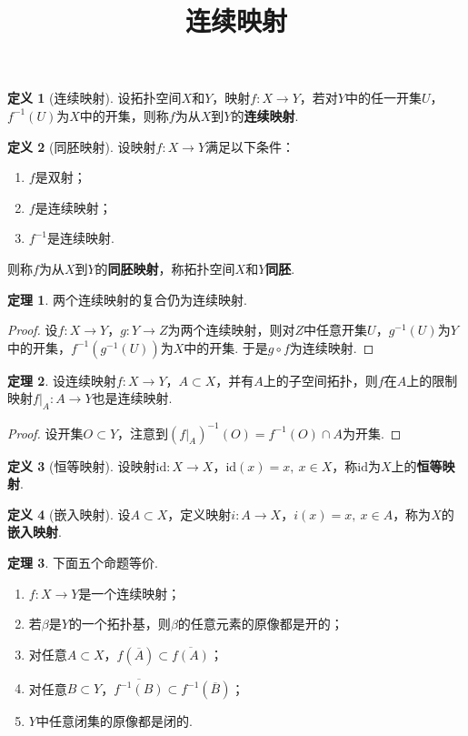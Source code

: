 \documentclass[12pt]{ctexart}
\title{\vspace{-2em}\textbf{连续映射}\vspace{-2em}}
\date{ }
\theoremstyle{definition}
\newtheorem{definition}{定义}
\newtheorem{theorem}{定理}
\theoremstyle{plain}
\begin{document}
	\maketitle
	\begin{definition}[连续映射]
		设拓扑空间$X$和$Y$，映射$f:X\to Y$，若对$Y$中的任一开集$U$，$f^{-1}(U)$为$X$中的开集，则称$f$为从$X$到$Y$的\textbf{连续映射}.
	\end{definition}
	\begin{definition}[同胚映射]
		设映射$f:X\to Y$满足以下条件：
		\begin{enumerate}
			\item $f$是双射；
			\item $f$是连续映射；
			\item $f^{-1}$是连续映射.
		\end{enumerate}
		则称$f$为从$X$到$Y$的\textbf{同胚映射}，称拓扑空间$X$和$Y$\textbf{同胚}.
	\end{definition}
	\begin{theorem}
		两个连续映射的复合仍为连续映射.
	\end{theorem}
	\begin{proof}
		设$f:X\to Y$，$g:Y\to Z$为两个连续映射，则对$Z$中任意开集$U$，$g^{-1}(U)$为$Y$中的开集，$f^{-1}\left(g^{-1}(U)\right)$为$X$中的开集. 于是$g\circ f$为连续映射.
	\end{proof}
	\begin{theorem}
		设连续映射$f:X\to Y$，$A\subset X$，并有$A$上的子空间拓扑，则$f$在$A$上的限制映射$f\big|_A:A\to Y$也是连续映射.
	\end{theorem}
	\begin{proof}
		设开集$O\subset Y$，注意到$(f\big|_A)^{-1}(O)=f^{-1}(O)\cap A$为开集.
	\end{proof}
	\begin{definition}[恒等映射]
		设映射$\mathrm{id}:X\to X$，$\mathrm{id}(x)=x,\ x\in X$，称$\mathrm{id}$为$X$上的\textbf{恒等映射}.
	\end{definition}
	\begin{definition}[嵌入映射]
		设$A\subset X$，定义映射$i:A\to X$，$i(x)=x,\ x\in A$，称为$X$的\textbf{嵌入映射}.
	\end{definition}
	\begin{theorem}
		下面五个命题等价.
		\begin{enumerate}
			\item $f:X\to Y$是一个连续映射；
			\item 若$\beta$是$Y$的一个拓扑基，则$\beta$的任意元素的原像都是开的；
			\item 对任意$A\subset X$，$f(\overline{A})\subset\overline{f(A)}$；
			\item 对任意$B\subset Y$，$\overline{f^{-1}(B)}\subset f^{-1}(\overline{B})$；
			\item $Y$中任意闭集的原像都是闭的.
		\end{enumerate}
	\end{theorem}
\end{document}
